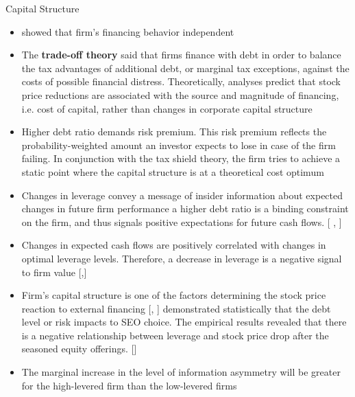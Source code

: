\documentclass{beamer}
\begin{document}
	
	
	\begin{frame}{Capital Structure}
		\begin{itemize}
			\tiny 
			\item \cite{modigliani1958cost} showed that firm’s financing behavior independent
			\item The \textbf{trade-off theory} said that
			firms finance with debt in order to balance the tax advantages of additional debt, or
			marginal tax exceptions, against the costs of possible financial distress. Theoretically, analyses predict that stock price reductions are associated with the source and magnitude
			of financing, i.e. cost of capital, rather than changes in corporate capital structure
			\item Higher debt ratio  demands  risk premium. This risk premium reflects the probability-weighted amount an investor expects to lose in case of the firm failing. In conjunction with the tax shield theory, the firm tries to achieve a static point where the capital structure is at a theoretical cost optimum
			\item Changes in leverage convey a message of insider information about expected changes in future firm performance a higher debt ratio is a binding
			constraint on the firm, and thus signals positive expectations for future cash flows. [\cite{ross1977determination} , \cite{downes1982signaling}] 
			\item  Changes in expected cash flows are positively correlated with changes in optimal leverage levels. Therefore, a decrease in leverage is a negative
			signal to firm value [\cite{deangelo1980optimal},\cite{modigliani1963corporate}]
			\item  Firm’s
			capital structure is one of the factors determining the stock price reaction to external
			financing
			[\cite{dierkens1991information},
			\cite{raymar1993financing}] 
			\cite{cronqvist2005choice}  demonstrated
			statistically that the debt level or risk impacts to SEO choice. The empirical results revealed that there is a negative relationship between leverage and stock price drop after the seasoned equity offerings. [\cite{quyhn2009leverage}]
			\item The marginal increase
			in the level of information asymmetry will be greater for the high-levered firm than the
			low-levered firms 
		\end{itemize}
	\end{frame}
	
\end{document}
